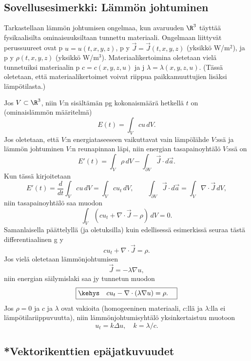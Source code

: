 \subsection{Sovellusesimerkki: Lämmön johtuminen}

Tarkastellaan lämmön johtumisen ongelmaa, kun avaruuden $\R^3$ täyttää fysikaalisilta 
ominaisuuksiltaan tunnettu materiaali. Ongelmaan liittyvät perussuureet ovat
p $u=u(t,x,y,z)$, p y 
$\vec J=\vec J(t,x,y,z)$ (yksikkö W/m$^2$), ja p y 
$\rho(t,x,y,z)$ (yksikkö W/m$^3$). Materiaalikertoimina oletetaan vielä tunnetuiksi materiaalin 
p $c=c(x,y,z,u)$ ja j 
$\lambda=\lambda(x,y,z,u)$. (Tässä oletetaan, että materiaalikertoimet voivat riippua 
paikkamuuttujien lisäksi lämpötilasta.)

Jos $V\subset\R^3$, niin $V$:n sisältämän pg kokonaismäärä
hetkellä $t$ on (ominaislämmön määritelmä)
\[
E(t)=\int_V cu\,dV.
\]
Jos oletetaan, että $V$:n energiataseeseen vaikuttavat vain lämpölähde $V$:ssä ja lämmön
johtuminen $V$:n reunapinnan läpi, niin energian tasapainoyhtälö $V$:ssä on
\[
E'(t)= \int_V \rho\,dV - \int_{\partial V} \vec J\cdot d\vec a.
\]
Kun tässä kirjoitetaan
\[
E'(t)=\frac{d}{dt}\int_V cu\,dV = \int_V cu_t\,dV, \qquad
      \int_{\partial V} \vec J\cdot d\vec a = \int_V \nabla\cdot\vec J\,dV,
\]
niin tasapainoyhtälö saa muodon
\[
\int_V (cu_t+\nabla\cdot\vec J-\rho)\,dV = 0.
\]
Samanlaisella päättelyllä (ja oletuksilla) kuin edellisessä esimerkissä seuraa tästä 
differentiaalinen g y
\[
cu_t+\nabla\cdot\vec J = \rho.
\]
Jos vielä oletetaan lämmönjohtumisen  
%
\[
\vec J = -\lambda \nabla u,
\]
%
niin energian säilymislaki saa jy tunnetun muodon
\[
\boxed{\kehys\quad cu_t-\nabla\cdot(\lambda\nabla u)=\rho. \quad}
\]
Jos $\rho=0$ ja $c$ ja $\lambda$ ovat vakioita (homogeeninen materiaali, $c$:llä ja
$\lambda$:lla ei lämpötilariippuvuutta), niin lämmönjohtumisyhtälö yksinkertaistuu muotoon
\[
u_t=k\Delta u, \quad k=\lambda/c.
\]
 
\subsection{*Vektorikenttien epäjatkuvuudet}

